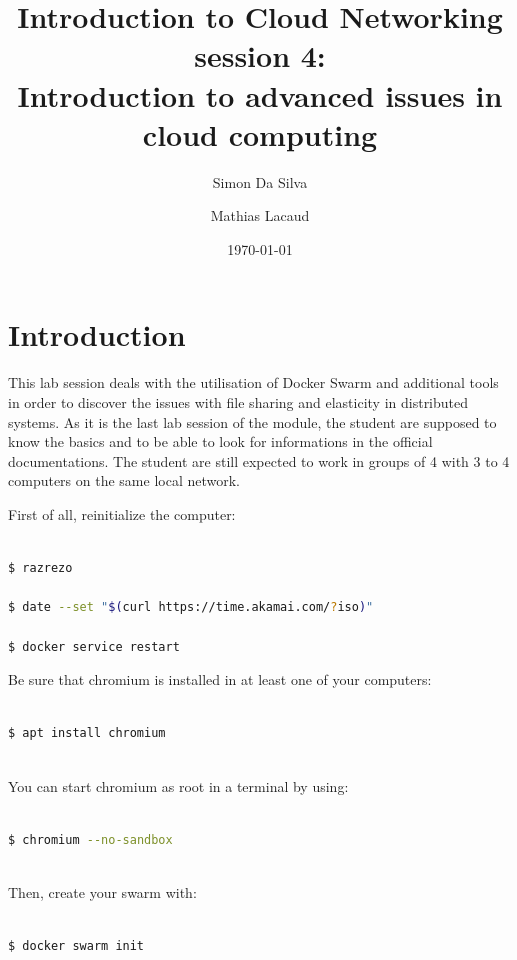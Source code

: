 \documentclass[a4paper,11pt]{exam}
\date{\today}
\title{Introduction to Cloud Networking session 4: \\
Introduction to advanced issues in cloud computing}
\author{Simon Da Silva \and Mathias Lacaud}
\begin{document}
	
	

\maketitle

\section{Introduction}
This lab session deals with the utilisation of Docker Swarm and additional 
tools in order to discover the issues with file sharing and elasticity in 
distributed systems. As it is the last lab session of the module, the student 
are supposed to know the basics and to be able to look for informations in 
the official documentations. The student are still expected to work in 
groups of 4 with 3 to 4 computers on the same local network. 

First of all, reinitialize the computer:

\begin{lstlisting}[frame=single,language={sh}]  % Start your code-block

$ razrezo

$ date --set "$(curl https://time.akamai.com/?iso)"

$ docker service restart 

\end{lstlisting}

Be sure that chromium is installed in at least one of your computers: 

\begin{lstlisting}[frame=single,language={sh}]  % Start your code-block

$ apt install chromium
	
\end{lstlisting}

You can start chromium as root in a terminal by using: 

\begin{lstlisting}[frame=single,language={sh}]  % Start your code-block

$ chromium --no-sandbox
		
\end{lstlisting}

Then, create your swarm with: 
\begin{lstlisting}[frame=single,language={sh}]  % Start your code-block

$ docker swarm init
\end{lstlisting}
\end{document}
